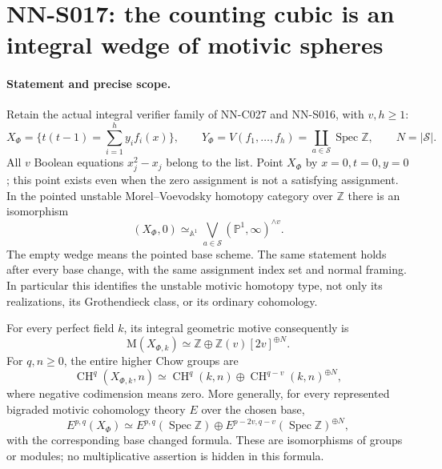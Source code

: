 \section{NN-S017: the counting cubic is an integral wedge of motivic spheres}

\paragraph{Statement and precise scope.}
Retain the actual integral verifier family of NN-C027 and NN-S016,
with $v,h\ge1$:
\[
 X_\Phi=\{t(t-1)=\textstyle\sum_{i=1}^h y_i f_i(x)\},\qquad
 Y_\Phi=V(f_1,\ldots,f_h)=\coprod_{a\in\mathcal S}\operatorname{Spec}\mathbb Z,
 \qquad N=|\mathcal S|.
\]
All $v$ Boolean equations $x_j^2-x_j$ belong to the list. Point
$X_\Phi$ by $x=0,t=0,y=0$; this point exists even when the zero
assignment is not a satisfying assignment. In the pointed unstable
Morel--Voevodsky homotopy category over $\mathbb Z$ there is an isomorphism
\begin{equation}\label{eq:S017-motivic-wedge}
 (X_\Phi,0)\simeq_{\mathbb A^1}
       \bigvee_{a\in\mathcal S}(\mathbb P^1,\infty)^{\wedge v}.
\end{equation}
The empty wedge means the pointed base scheme. The same statement holds
after every base change, with the same assignment index set and normal
framing. In particular this identifies the unstable motivic homotopy
type, not only its realizations, its Grothendieck class, or its ordinary
cohomology.

For every perfect field $k$, its integral geometric motive consequently is
\begin{equation}\label{eq:S017-motive}
 \mathrm M(X_{\Phi,k})\simeq
       \mathbb Z\oplus\mathbb Z(v)[2v]^{\oplus N}.
\end{equation}
For $q,n\ge0$, the entire higher Chow groups are
\begin{equation}\label{eq:S017-higher-chow}
 \operatorname{CH}^{q}(X_{\Phi,k},n)\simeq
 \operatorname{CH}^{q}(k,n)\oplus
       \operatorname{CH}^{q-v}(k,n)^{\oplus N},
\end{equation}
where negative codimension means zero. More generally, for every represented
bigraded motivic cohomology theory $E$ over the chosen base,
\[
 E^{p,q}(X_\Phi)\simeq E^{p,q}(\operatorname{Spec}\mathbb Z)
       \oplus E^{p-2v,q-v}(\operatorname{Spec}\mathbb Z)^{\oplus N},
\]
with the corresponding base changed formula. These are isomorphisms of
groups or modules; no multiplicative assertion is hidden in this formula.

